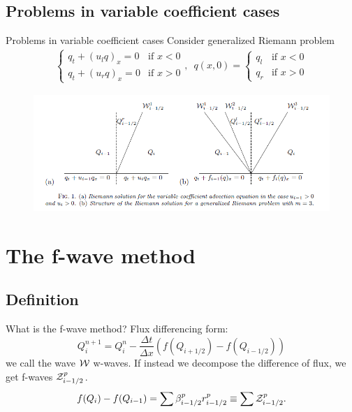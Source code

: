 \documentclass{beamer}
\begin{document}
\subsection{Problems in variable coefficient cases}
\begin{frame}{Problems in variable coefficient cases}
Consider generalized Riemann problem
\begin{align*}
	\begin{cases}q_t+(u_l q)_x=0 & \text{if } x<0 \\
	q_t+(u_r q)_x=0 & \text{if } x>0\end{cases}, \,\,\,
	q(x,0)=\begin{cases}q_l & \text{if } x<0 \\
	q_r & \text{if } x>0\end{cases}
\end{align*}
\begin{figure}
  \centering
  \includegraphics[width=\textwidth]{discon.png}\\
\end{figure}
\cite[p. 960]{bale2002}
\end{frame}

\section{The f-wave method}
\subsection{Definition}
\begin{frame}{What is the f-wave method?}
Flux differencing form: 
\[
Q^{n+1}_i=Q^n_i-\frac{\Delta t}{\Delta x}\left( f(Q_{i+1/2})-f(Q_{i-1/2})\right)
\]
we call the wave ${\cal W}$ w-waves. If instead we decompose the difference of flux, we get f-waves ${\cal Z}^p_{i-1/2}$.
\begin{align*}
f(Q_i)-f(Q_{i-1})=\sum \beta^p_{i-1/2} r^p_{i-1/2}\equiv \sum {\cal Z}^p_{i-1/2}.
\end{align*}
\end{frame}
\end{document}
